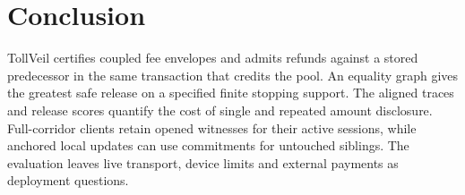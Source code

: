 \section{Conclusion}
\label{sec:conclusion}

TollVeil certifies coupled fee envelopes and admits refunds against a stored predecessor in the same transaction that credits the pool. An equality graph gives the greatest safe release on a specified finite stopping support. The aligned traces and release scores quantify the cost of single and repeated amount disclosure. Full-corridor clients retain opened witnesses for their active sessions, while anchored local updates can use commitments for untouched siblings. The evaluation leaves live transport, device limits and external payments as deployment questions.
